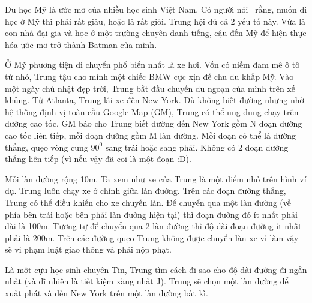 Du học Mỹ là ước mơ của nhiều học sinh Việt Nam. Có người nói  rằng, muốn đi học ở Mỹ thì phải rất giàu, hoặc là rất giỏi. Trung hội đủ cả 2 yếu tố này. Vừa là con nhà đại gia và học ở một trường chuyên danh tiếng, cậu đến Mỹ để hiện thực hóa ước mơ trở thành Batman của mình. \textbf{}

Ở Mỹ phương tiện di chuyển phổ biến nhất là xe hơi. Vốn có niềm đam mê ô tô từ nhỏ, Trung tậu cho mình một chiếc BMW cực xịn để chu du khắp Mỹ. Vào một ngày chủ nhật đẹp trời, Trung bắt đầu chuyến du ngoạn của mình trên xế khủng. Từ Atlanta, Trung lái xe đến New York. Dù không biết đường nhưng nhờ hệ thống định vị toàn cầu Google Map (GM), Trung có thể ung dung chạy trên đường cao tốc. GM báo cho Trung biết đường đến New York gồm N đoạn đường cao tốc liên tiếp, mỗi đoạn đường gồm M làn đường. Mỗi đoạn có thể là đường thẳng, quẹo vòng cung $90^{0}$ sang trái hoặc sang phải. Không có 2 đoạn đường thẳng liên tiếp (vì nếu vậy đã coi là một đoạn :D).

Mỗi làn đường rộng 10m. Ta xem như xe của Trung là một điểm nhỏ trên hình ví dụ. Trung luôn chạy xe ở chính giữa làn đường. Trên các đoạn đường thẳng, Trung có thể điều khiển cho xe chuyển làn. Để chuyển qua một làn đường (về phía bên trái hoặc bên phải làn đường hiện tại) thì đoạn đường đó ít nhất phải dài là 100m. Tương tự để chuyển qua 2 làn đường thì độ dài đoạn đường ít nhất phải là 200m. Trên các đường quẹo Trung không được chuyển làn xe vì làm vậy sẽ vi phạm luật giao thông và phải nộp phạt.

Là một cựu học sinh chuyên Tin, Trung tìm cách đi sao cho độ dài đường đi ngắn nhất (và dĩ nhiên là tiết kiệm xăng nhất J). Trung sẽ chọn một làn đường để xuất phát và đến New York trên một làn đường bất kì.